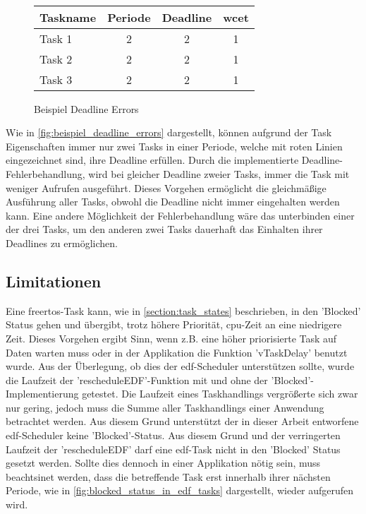 \documentclass[../EDF Master Thesis.tex]{subfiles}
\begin{document}
\begin{figure}[H]
\\
        \vspace {1cm}
        \begin{tabular}{l|c|c|c}
            Taskname & Periode & Deadline & \ac{wcet} \\
            \hline
            Task 1 & 2 & 2 & 1 \\
            Task 2 & 2 & 2 & 1 \\
            Task 3 & 2 & 2 & 1 
        \end{tabular}
        \caption{Beispiel Deadline Errors}
        \label{fig:beispiel_deadline_errors}
    \end{figure}

    Wie in \autoref{fig:beispiel_deadline_errors} dargestellt, können aufgrund der Task Eigenschaften immer nur zwei Tasks in einer Periode, welche mit roten Linien eingezeichnet sind, ihre Deadline erfüllen.
    Durch die implementierte Deadline-Fehlerbehandlung, wird bei gleicher Deadline zweier Tasks, immer die Task mit weniger Aufrufen ausgeführt.
    Dieses Vorgehen ermöglicht die gleichmäßige Ausführung aller Tasks, obwohl die Deadline nicht immer eingehalten werden kann.
    Eine andere Möglichkeit der Fehlerbehandlung wäre das unterbinden einer der drei Tasks, um den anderen zwei Tasks dauerhaft das Einhalten ihrer Deadlines zu ermöglichen.

\clearpage

\subsection{Limitationen} \label{section:limitationen}

    Eine \ac{freertos}-Task kann, wie in \autoref{section:task_states} beschrieben, in den 'Blocked' Status gehen und übergibt, trotz höhere Priorität, \ac{cpu}-Zeit an eine niedrigere Zeit.
    Dieses Vorgehen ergibt Sinn, wenn z.B. eine höher priorisierte Task auf Daten warten muss oder in der Applikation die Funktion 'vTaskDelay' benutzt wurde.
    Aus der Überlegung, ob dies der \ac{edf}-Scheduler unterstützen sollte, wurde die Laufzeit der 'rescheduleEDF'-Funktion mit und ohne der 'Blocked'-Implementierung getestet.
    Die Laufzeit eines Taskhandlings vergrößerte sich zwar nur gering, jedoch muss die Summe aller Taskhandlings einer Anwendung betrachtet werden.
    Aus diesem Grund unterstützt der in dieser Arbeit entworfene \ac{edf}-Scheduler keine 'Blocked'-Status.
    Aus diesem Grund und der verringerten Laufzeit der 'rescheduleEDF' darf eine \ac{edf}-Task nicht in den 'Blocked' Status gesetzt werden.  
    Sollte dies dennoch in einer Applikation nötig sein, muss beachtsinet werden, dass die betreffende Task erst innerhalb ihrer nächsten Periode, wie in \autoref{fig:blocked_status_in_edf_tasks} dargestellt, wieder aufgerufen wird.
\end{document}
